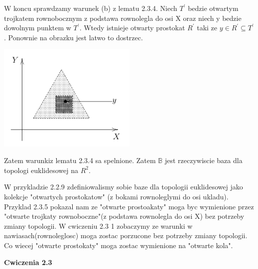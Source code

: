 \documentclass{article}
\begin{document}
W koncu sprawdzamy warunek (b) z lematu 2.3.4. Niech $T^{\prime}$ bedzie otwartym trojkatem rownobocznym z podstawa rownolegla do osi X oraz niech y bedzie dowolnym punktem w $T^{\prime}$. Wtedy istnieje otwarty prostokat $R^{\prime}$ taki ze $y \in R^{\prime} \subseteq T^{\prime}$. Ponownie na obrazku jest latwo to dostrzec.

\begin{center}
    \begin{minipage}[h]{0.8\textwidth}
        \centering
        \includegraphics[width=0.5\textwidth]{trojkat3.png}
    \end{minipage}
\end{center}


Zatem warunkiz lematu 2.3.4 sa spelnione. Zatem $\mathbb{B}$ jest rzeczywiscie baza dla topologi euklidesowej na $R^{2}$.

\vspace{1cm}

W przykladzie 2.2.9 zdefiniowalismy sobie baze dla topologii euklidesowej jako kolekcje "otwartych prostokatow" (z bokami rownoleglymi do osi ukladu). Przyklad 2.3.5 pokazal nam ze "otwarte prostoakaty" moga byc wymienione przez "otwarte trojkaty rownoboczne"(z podstawa rownolegla do osi X) bez potrzeby zmiany topologii. W cwiczeniu 2.3 1 zobaczymy ze warunki w nawiasach(rownoleglosc) moga zostac porzucone bez potrzeby zmiany topologii. Co wiecej "otwarte prostokaty" moga zostac wymienione na "otwarte kola".

\textbf{Cwiczenia 2.3}

\hrulefill
\end{document}

